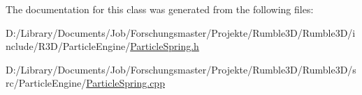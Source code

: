 The documentation for this class was generated from the following files\+:\begin{DoxyCompactItemize}
\item 
D\+:/\+Library/\+Documents/\+Job/\+Forschungsmaster/\+Projekte/\+Rumble3\+D/\+Rumble3\+D/include/\+R3\+D/\+Particle\+Engine/\mbox{\hyperlink{_particle_spring_8h}{Particle\+Spring.\+h}}\item 
D\+:/\+Library/\+Documents/\+Job/\+Forschungsmaster/\+Projekte/\+Rumble3\+D/\+Rumble3\+D/src/\+Particle\+Engine/\mbox{\hyperlink{_particle_spring_8cpp}{Particle\+Spring.\+cpp}}\end{DoxyCompactItemize}
